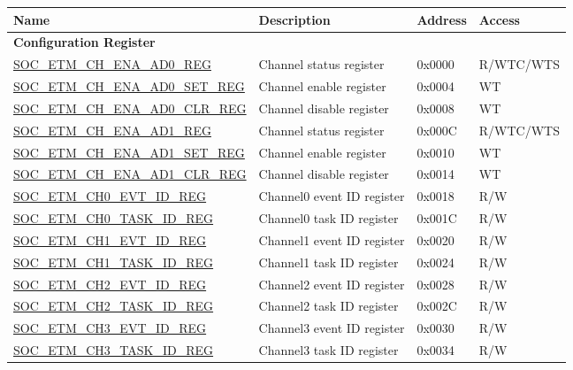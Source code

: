 \begin{longtable}{ | p{6cm} | p{6.4cm} | p{1.3cm} | p{1.8cm} | }
\hline\rowcolor{lightgray}
\textbf{Name} & \textbf{Description} &  \textbf{Address} & \textbf{Access} \\ \hline
\endhead
\multicolumn{4}{|l|}{\textbf{Configuration Register}} \\ \hline
\hyperref[regdesc:SOCETMCHENAAD0REG]{SOC\_ETM\_CH\_ENA\_AD0\_REG} & Channel status register & 0x0000 & R/WTC/WTS \\ \hline
\hyperref[regdesc:SOCETMCHENAAD0SETREG]{SOC\_ETM\_CH\_ENA\_AD0\_SET\_REG} & Channel enable register & 0x0004 & WT \\ \hline
\hyperref[regdesc:SOCETMCHENAAD0CLRREG]{SOC\_ETM\_CH\_ENA\_AD0\_CLR\_REG} & Channel disable register & 0x0008 & WT \\ \hline
\hyperref[regdesc:SOCETMCHENAAD1REG]{SOC\_ETM\_CH\_ENA\_AD1\_REG} & Channel status register & 0x000C & R/WTC/WTS \\ \hline
\hyperref[regdesc:SOCETMCHENAAD1SETREG]{SOC\_ETM\_CH\_ENA\_AD1\_SET\_REG} & Channel enable register & 0x0010 & WT \\ \hline
\hyperref[regdesc:SOCETMCHENAAD1CLRREG]{SOC\_ETM\_CH\_ENA\_AD1\_CLR\_REG} & Channel disable register & 0x0014 & WT \\ \hline
\hyperref[regdesc:SOCETMCH0EVTIDREG]{SOC\_ETM\_CH0\_EVT\_ID\_REG} & Channel0 event ID register & 0x0018 & R/W \\ \hline
\hyperref[regdesc:SOCETMCH0TASKIDREG]{SOC\_ETM\_CH0\_TASK\_ID\_REG} & Channel0 task ID register & 0x001C & R/W \\ \hline
\hyperref[regdesc:SOCETMCH0EVTIDREG]{SOC\_ETM\_CH1\_EVT\_ID\_REG} & Channel1 event ID register & 0x0020 & R/W \\ \hline
\hyperref[regdesc:SOCETMCH0TASKIDREG]{SOC\_ETM\_CH1\_TASK\_ID\_REG} & Channel1 task ID register & 0x0024 & R/W \\ \hline
\hyperref[regdesc:SOCETMCH0EVTIDREG]{SOC\_ETM\_CH2\_EVT\_ID\_REG} & Channel2 event ID register & 0x0028 & R/W \\ \hline
\hyperref[regdesc:SOCETMCH0TASKIDREG]{SOC\_ETM\_CH2\_TASK\_ID\_REG} & Channel2 task ID register & 0x002C & R/W \\ \hline
\hyperref[regdesc:SOCETMCH0EVTIDREG]{SOC\_ETM\_CH3\_EVT\_ID\_REG} & Channel3 event ID register & 0x0030 & R/W \\ \hline
\hyperref[regdesc:SOCETMCH0TASKIDREG]{SOC\_ETM\_CH3\_TASK\_ID\_REG} & Channel3 task ID register & 0x0034 & R/W \\ \hline

\end{longtable}
